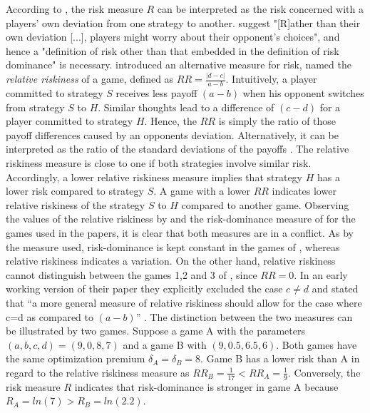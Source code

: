 According to \textcite{rydval_loss_2005}, the risk measure $R$ 
can be interpreted as the risk concerned with a players' 
own deviation from one strategy to another.
\textcite[19]{rydval_loss_2005} suggest "[R]ather than their
own deviation [...], players might worry about their opponent's choices", 
and hence a "definition of risk other than that embedded in the definition
of risk dominance" is necessary.
\textcite[371]{dubois_optimization_2012} 
introduced an alternative measure for risk, named the 
\textit{relative riskiness} of a game, defined as $RR = \frac{|d-c|}{a-b}$.
Intuitively, a player committed to strategy $S$ receives less payoff $(a-b)$  
when his opponent switches from strategy $S$ to $H$. Similar thoughts lead
to a difference of $(c-d)$ for a player committed to strategy $H$. Hence, the
$RR$ is simply the ratio of those payoff differences caused by an opponents
deviation.
Alternatively, it can be interpreted as the ratio of the 
standard deviations of the payoffs 
\parencite[372]{dubois_optimization_2012}. 
The relative riskiness measure is close to one if both strategies involve
similar risk. 
Accordingly, a lower relative riskiness measure implies that
strategy $H$ has a lower risk compared to strategy $S$.
A game with a lower $RR$ indicates lower relative riskiness of the strategy
$S$ to $H$ compared to another game.
Observing the values of the relative riskiness by 
\textcite{dubois_optimization_2012} and the risk-dominance measure of 
\textcite{schmidt_playing_2003} for the games used in the papers, it is clear
that both measures are in a conflict. As by the measure 
\textcite{schmidt_playing_2003} used, risk-dominance is kept 
constant in the games of  \textcite{battalio_optimization_2001}, 
whereas relative riskiness indicates a variation. 
On the other hand, relative riskiness cannot distinguish between
the games 1,2 and 3 of \textcite{schmidt_playing_2003}, since $RR=0$. In an
early working version of their paper they explicitly excluded the case 
$c \neq d$ and stated that ``a more general measure of relative riskiness 
should allow for the case where c=d as compared to $(a-b)$'' 
\parencite{dubois_optimization_2008}. The distinction between the two
measures can be illustrated by two games. Suppose a game A with the parameters 
$(a,b,c,d) =(9,0,8,7)$ and a game B with $(9,0.5,6.5,6)$. Both games
have the same optimization premium $\delta_A = \delta_B = 8$.
Game B has a lower risk than A in regard to the relative riskiness
measure as $RR_B=\frac{1}{17} < RR_A =\frac19$. Conversely, the 
risk measure $R$ indicates that risk-dominance is stronger in game A because
$R_A =ln(7) > R_B=ln(2.2)$.


